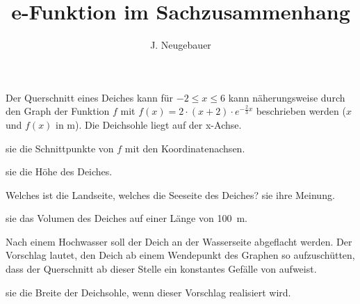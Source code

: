 \documentclass[11pt, a5paper, landscape, final]{scrartcl}
\author{J. Neugebauer}
\title{e-Funktion im Sachzusammenhang}
\date{\Heute}
\begin{document}
	\begin{aufgabe}
		Der Querschnitt eines Deiches kann für $-2 \leq x \leq 6$ kann näherungsweise durch den Graph der Funktion $f$ mit $f(x) = 2\cdot (x+2)\cdot e^{-\tfrac{2}{3}x}$ beschrieben werden ($x$ und $f(x)$ in \si{\meter}). Die Deichsohle liegt auf der x-Achse.
		
		\begin{enumeratea}
			\item {} sie die Schnittpunkte von $f$ mit den Koordinatenachsen. 
			\item {} sie die Höhe des Deiches.
			\item Welches ist die Landseite, welches die Seeseite des Deiches?  sie ihre Meinung.
			\item {} sie das Volumen des Deiches auf einer Länge von \SI{100}{\meter}.
			\item Nach einem Hochwasser soll der Deich an der Wasserseite abgeflacht werden. Der Vorschlag lautet, den Deich ab einem Wendepunkt des Graphen so aufzuschütten, dass der Querschnitt ab dieser Stelle ein konstantes Gefälle von  aufweist.
			
			 sie die Breite der Deichsohle, wenn dieser Vorschlag realisiert wird.
		\end{enumeratea}
	\end{aufgabe}
	\clearpage
	
\end{document}
